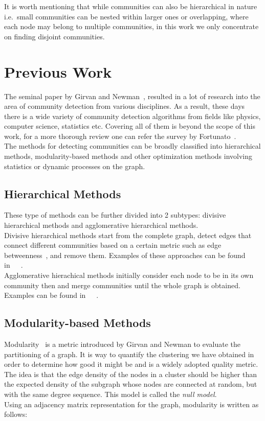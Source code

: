 \begin{spacing}{1.5}
\indent It is worth mentioning that while communities can also be hierarchical in nature i.e.\, small communities can be nested within larger ones or overlapping, where each node may belong to multiple communities, in this work we only concentrate on finding disjoint communities.

\section{Previous Work}

The seminal paper by Girvan and Newman~\cite{Girvan11062002}, resulted in a lot of research into the area of community detection from various disciplines. As a result, these days there is a wide variety of community detection algorithms from fields like physics, computer science, statistics etc. Covering all of them is beyond the scope of this work, for a more thorough review one can refer the survey by Fortunato~\cite{Fortunato201075}.\\
\indent The methods for detecting communities can be broadly classified into hierarchical methods, modularity-based methods and other optimization methods involving statistics or dynamic processes on the graph.

\subsection{Hierarchical Methods}

These type of methods can be further divided into 2 subtypes: divisive hierarchical methods and agglomerative hierarchical methods.\\
\indent Divisive hierarchical methods start from the complete graph, detect edges that connect different communities based on a certain metric such as edge betweenness~\cite{Girvan11062002}, and remove them. Examples of these approaches can be found in~\cite{Girvan11062002}~\cite{Radicchi02032004}~\cite{PhysRevE.69.026113}.\\
\indent Agglomerative hierachical methods initially consider each node to be in its own community then and merge communities until the whole graph is obtained. Examples can be found in~\cite{newman03fast}~\cite{blondel2008fuc}~\cite{Clauset2004}.

\subsection{Modularity-based Methods}

Modularity~\cite{PhysRevE.69.026113} is a metric introduced by Girvan and Newman to evaluate the partitioning of a graph. It is way to quantify the clustering we have obtained in order to determine how good it might be and is a widely adopted quality metric. The idea is that the edge density of the nodes in a cluster should be higher than the expected density of the subgraph whose nodes are connected at random, but with the same degree sequence. This model is called the \emph{null model}. \\
\indent Using an adjacency matrix representation for the graph, modularity is written as follows:


\end{spacing}
